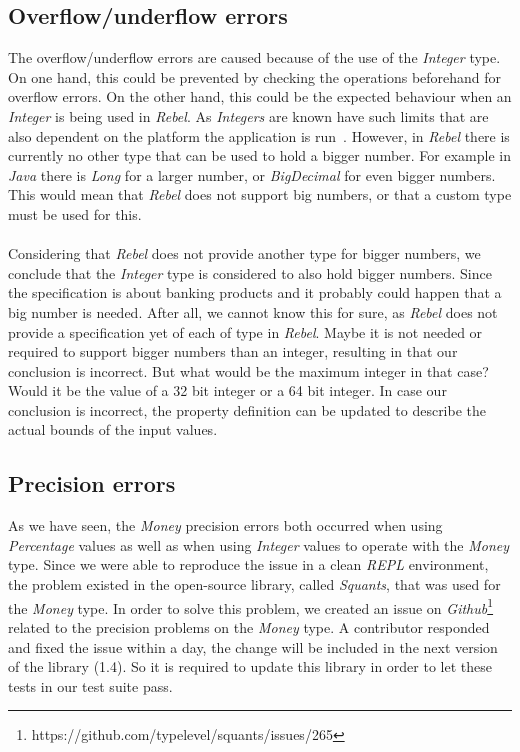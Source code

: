 \subsection*{Overflow/underflow errors}
The overflow/underflow errors are caused because of the use of the
\textit{Integer} type. On one hand, this could be prevented by checking the
operations beforehand for overflow errors. On the other hand, this could be the
expected behaviour when an \textit{Integer} is being used in \textit{Rebel}. As
\textit{Integers} are known have such limits that are also dependent on the
platform the application is run~\cite{wang2009intscope}. However, in
\textit{Rebel} there is currently no other type that can be used to hold a
bigger number. For example in \textit{Java} there is \textit{Long} for a larger
number, or \textit{BigDecimal} for even bigger numbers. This would mean that
\textit{Rebel} does not support big numbers, or that a custom type must be used
for this.\\
\\
Considering that \textit{Rebel} does not provide another type for
bigger numbers, we conclude that the \textit{Integer} type is considered to also
hold bigger numbers. Since the specification is about banking products and it
probably could happen that a big number is needed. After all, we cannot know
this for sure, as \textit{Rebel} does not provide a specification yet of each of
type in \textit{Rebel}. Maybe it is not needed or required to support bigger
numbers than an integer, resulting in that our conclusion is incorrect. But what
would be the maximum integer in that case? Would it be the value of a 32 bit
integer or a 64 bit integer. In case our conclusion is incorrect, the property
definition can be updated to describe the actual bounds of the input values.

\subsection*{Precision errors}
As we have seen, the \textit{Money} precision errors both occurred when using
\textit{Percentage} values as well as when using \textit{Integer} values to
operate with the \textit{Money} type. Since we were able to reproduce the issue
in a clean \textit{REPL} environment, the problem existed in the open-source
library, called \textit{Squants}, that was used for the \textit{Money} type. In
order to solve this problem, we created an issue on
\textit{Github}\footnote{https://github.com/typelevel/squants/issues/265}
related to the precision problems on the \textit{Money} type. A contributor
responded and fixed the issue within a day, the change will be included in the
next version of the library (1.4). So it is required to update this library in
order to let these tests in our test suite pass.

